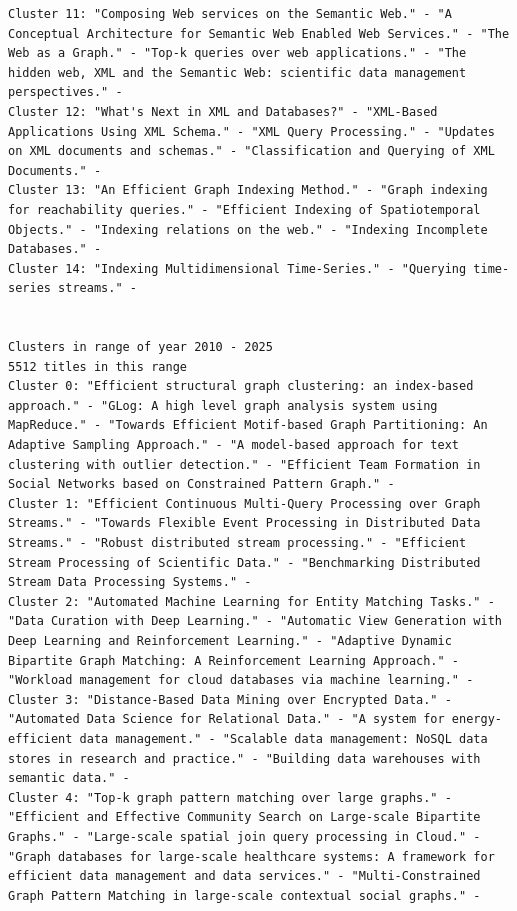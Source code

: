 \documentclass[a4paper,fontsize=11pt]{article}
\begin{document}
\begin{lstlisting}[caption={KMeans output},label={lst:output},breaklines]
Cluster 11: "Composing Web services on the Semantic Web." - "A Conceptual Architecture for Semantic Web Enabled Web Services." - "The Web as a Graph." - "Top-k queries over web applications." - "The hidden web, XML and the Semantic Web: scientific data management perspectives." - 
Cluster 12: "What's Next in XML and Databases?" - "XML-Based Applications Using XML Schema." - "XML Query Processing." - "Updates on XML documents and schemas." - "Classification and Querying of XML Documents." - 
Cluster 13: "An Efficient Graph Indexing Method." - "Graph indexing for reachability queries." - "Efficient Indexing of Spatiotemporal Objects." - "Indexing relations on the web." - "Indexing Incomplete Databases." - 
Cluster 14: "Indexing Multidimensional Time-Series." - "Querying time-series streams." - 


Clusters in range of year 2010 - 2025
5512 titles in this range
Cluster 0: "Efficient structural graph clustering: an index-based approach." - "GLog: A high level graph analysis system using MapReduce." - "Towards Efficient Motif-based Graph Partitioning: An Adaptive Sampling Approach." - "A model-based approach for text clustering with outlier detection." - "Efficient Team Formation in Social Networks based on Constrained Pattern Graph." - 
Cluster 1: "Efficient Continuous Multi-Query Processing over Graph Streams." - "Towards Flexible Event Processing in Distributed Data Streams." - "Robust distributed stream processing." - "Efficient Stream Processing of Scientific Data." - "Benchmarking Distributed Stream Data Processing Systems." - 
Cluster 2: "Automated Machine Learning for Entity Matching Tasks." - "Data Curation with Deep Learning." - "Automatic View Generation with Deep Learning and Reinforcement Learning." - "Adaptive Dynamic Bipartite Graph Matching: A Reinforcement Learning Approach." - "Workload management for cloud databases via machine learning." - 
Cluster 3: "Distance-Based Data Mining over Encrypted Data." - "Automated Data Science for Relational Data." - "A system for energy-efficient data management." - "Scalable data management: NoSQL data stores in research and practice." - "Building data warehouses with semantic data." - 
Cluster 4: "Top-k graph pattern matching over large graphs." - "Efficient and Effective Community Search on Large-scale Bipartite Graphs." - "Large-scale spatial join query processing in Cloud." - "Graph databases for large-scale healthcare systems: A framework for efficient data management and data services." - "Multi-Constrained Graph Pattern Matching in large-scale contextual social graphs." - 

\end{lstlisting}
\end{document}
